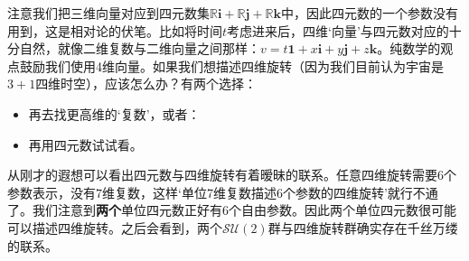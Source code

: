 注意我们把三维向量对应到四元数集$\mathbb{R}\mathbf{i} + \mathbb{R}\mathbf{j} + \mathbb{R}\mathbf{k}$中，因此四元数的一个参数没有用到，这是相对论的伏笔。比如将时间$t$考虑进来后，四维‘向量’与四元数对应的十分自然，就像二维复数与二维向量之间那样：$v = t\mathbf{1} + x\mathbf{i} + y\mathbf{j} + z\mathbf{k}$。纯数学的观点鼓励我们使用4维向量。如果我们想描述四维旋转（因为我们目前认为宇宙是$3+1$四维时空），应该怎么办？有两个选择：
\begin{itemize}
	\item 再去找更高维的‘复数’，或者：
	\item 再用四元数试试看。
\end{itemize}
从刚才的遐想可以看出四元数与四维旋转有着暧昧的联系。任意四维旋转需要$6$个参数表示，没有$7$维复数，这样‘单位7维复数描述6个参数的四维旋转’就行不通了。我们注意到{\bf 两个}单位四元数正好有$6$个自由参数。因此两个单位四元数很可能可以描述四维旋转。之后会看到，两个$\mathcal{SU}(2)$群与四维旋转群确实存在千丝万缕的联系。

